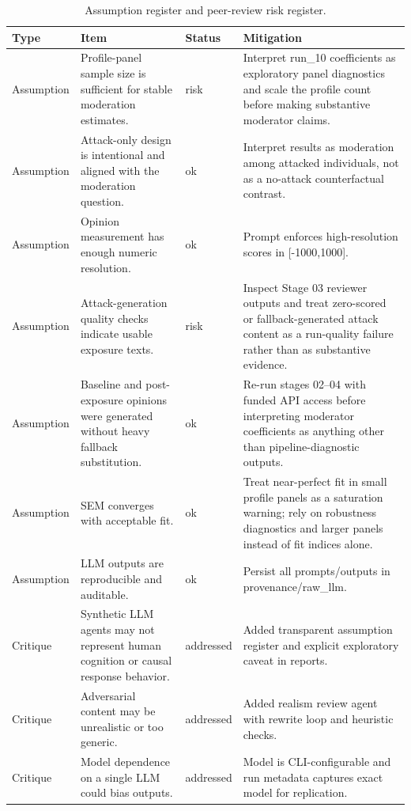 \begin{table}[htbp]
\centering
\begin{threeparttable}
\caption{Assumption register and peer-review risk register.}
\label{tab:risks}
\small
\setlength{\tabcolsep}{4.5pt}
\renewcommand{\arraystretch}{1.10}
\begin{tabular}{llll}
\toprule
Type & Item & Status & Mitigation \\
\midrule
Assumption & Profile-panel sample size is sufficient for stable moderation estimates. & risk & Interpret run\_10 coefficients as exploratory panel diagnostics and scale the profile count before making substantive moderator claims. \\
Assumption & Attack-only design is intentional and aligned with the moderation question. & ok & Interpret results as moderation among attacked individuals, not as a no-attack counterfactual contrast. \\
Assumption & Opinion measurement has enough numeric resolution. & ok & Prompt enforces high-resolution scores in [-1000,1000]. \\
Assumption & Attack-generation quality checks indicate usable exposure texts. & risk & Inspect Stage 03 reviewer outputs and treat zero-scored or fallback-generated attack content as a run-quality failure rather than as substantive evidence. \\
Assumption & Baseline and post-exposure opinions were generated without heavy fallback substitution. & ok & Re-run stages 02–04 with funded API access before interpreting moderator coefficients as anything other than pipeline-diagnostic outputs. \\
Assumption & SEM converges with acceptable fit. & ok & Treat near-perfect fit in small profile panels as a saturation warning; rely on robustness diagnostics and larger panels instead of fit indices alone. \\
Assumption & LLM outputs are reproducible and auditable. & ok & Persist all prompts/outputs in provenance/raw\_llm. \\
Critique & Synthetic LLM agents may not represent human cognition or causal response behavior. & addressed & Added transparent assumption register and explicit exploratory caveat in reports. \\
Critique & Adversarial content may be unrealistic or too generic. & addressed & Added realism review agent with rewrite loop and heuristic checks. \\
Critique & Model dependence on a single LLM could bias outputs. & addressed & Model is CLI-configurable and run metadata captures exact model for replication. \\

\end{tabular}
\end{threeparttable}
\end{table}

